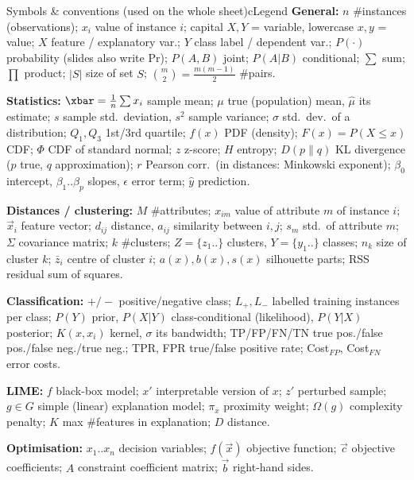 \begin{topic}{Symbols \& conventions (used on the whole sheet)}{cLegend}
\textbf{General:} $n$ \#instances (observations); $x_i$ value of instance $i$; capital $X,Y$ = variable, lowercase $x,y$ = value; $X$ feature / explanatory var.; $Y$ class label / dependent var.; $P(\cdot)$ probability (slides also write Pr); $P(A,B)$ joint; $P(A|B)$ conditional; $\sum$ sum; $\prod$ product; $|S|$ size of set $S$; $\binom{m}{2}=\frac{m(m-1)}{2}$ \#pairs.

\textbf{Statistics:} $\xbar=\frac1n\sum x_i$ sample mean; $\mu$ true (population) mean, $\hat\mu$ its estimate; $s$ sample std.\ deviation, $s^2$ sample variance; $\sigma$ std.\ dev.\ of a distribution; $Q_1,Q_3$ 1st/3rd quartile; $f(x)$ PDF (density); $F(x)=P(X\le x)$ CDF; $\Phi$ CDF of standard normal; $z$ z-score; $H$ entropy; $D(p\|q)$ KL divergence ($p$ true, $q$ approximation); $r$ Pearson corr.\ (in distances: Minkowski exponent); $\beta_0$ intercept, $\beta_1..\beta_p$ slopes, $\epsilon$ error term; $\hat y$ prediction.

\textbf{Distances / clustering:} $M$ \#attributes; $x_{im}$ value of attribute $m$ of instance $i$; $\vec x_i$ feature vector; $d_{ij}$ distance, $a_{ij}$ similarity between $i,j$; $s_m$ std.\ of attribute $m$; $\Sigma$ covariance matrix; $k$ \#clusters; $Z=\{z_1..\}$ clusters, $Y=\{y_1..\}$ classes; $n_k$ size of cluster $k$; $\bar z_i$ centre of cluster $i$; $a(x),b(x),s(x)$ silhouette parts; RSS residual sum of squares.

\textbf{Classification:} $+/-$ positive/negative class; $L_+,L_-$ labelled training instances per class; $P(Y)$ prior, $P(X|Y)$ class-conditional (likelihood), $P(Y|X)$ posterior; $K(x,x_i)$ kernel, $\sigma$ its bandwidth; TP/FP/FN/TN true pos./false pos./false neg./true neg.; TPR, FPR true/false positive rate; Cost$_{FP}$, Cost$_{FN}$ error costs.

\textbf{LIME:} $f$ black-box model; $x'$ interpretable version of $x$; $z'$ perturbed sample; $g\in G$ simple (linear) explanation model; $\pi_x$ proximity weight; $\Omega(g)$ complexity penalty; $K$ max \#features in explanation; $D$ distance.

\textbf{Optimisation:} $x_1..x_n$ decision variables; $f(\vec x)$ objective function; $\vec c$ objective coefficients; $A$ constraint coefficient matrix; $\vec b$ right-hand sides.
\end{topic}
